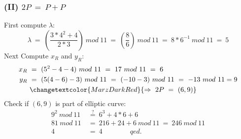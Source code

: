 \documentclass{report}
\begin{document}
			\subsubsection{(II) $2P \ = \ P + P$}
			\startsubsection
				First compute $\lambda$:
				\[
					\lambda \ = \ \left( \frac{3*4^2 + 4}{2*3} \right) \ mod \ 11 \ = \ \left( \frac{8}{6} \right) \ mod \ 11 \ = \ 8 * 6^{-1} \ mod \ 11 \ = \ 5
				\]
				Next Compute $x_R$ and $y_R$:
				\begin{align*}
					x_R \ & = \ (5^2 - 4 - 4) \ mod \ 11 \ = \ 17 \ mod \ 11 \ = \ 6 \\
					y_R \ & = \ (5(4 - 6) - 3) \ mod \ 11 \ = \ (-10 - 3) \ mod \ 11 \ = \ -13 \ mod \ 11 = 9 \\
					& \changetextcolor{MarzDarkRed}{\Rightarrow \ 2P \ = \ (6, 9)}
				\end{align*}
				Check if $(6,9)$ is part of elliptic curve:
				\begin{align*}
					9^2 \ mod \ 11 \ & \stackrel{?}{=} \ 6^3 + 4 * 6 + 6 \\
					81 \ mod \ 11 \ & = \ 216 + 24 + 6 \ mod \ 11 \ = \ 246 \ mod \ 11 \\
					4 \ & = \ 4 \hspace{4em} qed.
				\end{align*}
			\closesection
\end{document}
